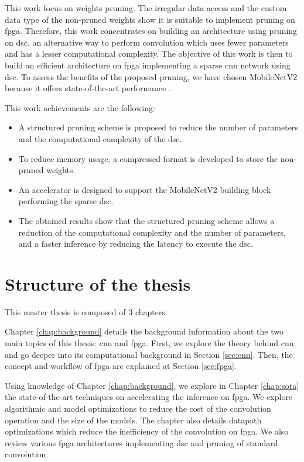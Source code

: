 This work focus on weights pruning. The irregular data access and the custom data type of the non-pruned weights show it is suitable to implement pruning on \acrshort{fpga}. Therefore, this work concentrates on building an architecture using pruning on \acrfull{dsc}, an alternative way to perform convolution which uses fewer parameters and has a lesser computational complexity. The objective of this work is then to build an efficient architecture on \acrshort{fpga} implementing a sparse \acrshort{cnn} network using \acrshort{dsc}. To assess the benefits of the proposed pruning, we have chosen MobileNetV2 because it offers state-of-the-art performance \cite{sandler_mobilenetv2_2019}.

This work achievements are the following:
%
\begin{itemize}
    \item A structured pruning scheme is proposed to reduce the number of parameters and the computational complexity of the \acrshort{dsc}.
    \item To reduce memory usage, a compressed format is developed to store the non-pruned weights.
    \item An accelerator is designed to support the MobileNetV2 building block performing the sparse \acrshort{dsc}.
    \item The obtained results show that the structured pruning scheme allows a reduction of the computational complexity and the number of parameters, and a faster inference by reducing the latency to execute the \acrshort{dsc}.
\end{itemize}
%
%
\section*{Structure of the thesis}
%
%
This master thesis is composed of 3 chapters.

Chapter \ref{chap:background} details the background information about the two main topics of this thesis: \acrshort{cnn} and \acrshort{fpga}. First, we explore the theory behind \acrshort{cnn} and go deeper into its computational background in Section \ref{sec:cnn}. Then, the concept and workflow of \acrshort{fpga} are explained at Section \ref{sec:fpga}.

Using knowledge of Chapter \ref{chap:background}, we explore in Chapter \ref{chap:sota} the state-of-the-art techniques on accelerating the inference on \acrshort{fpga}. We explore algorithmic and model optimizations to reduce the cost of the convolution operation and the size of the models. The chapter also details datapath optimizations which reduce the inefficiency of the convolution on \acrshort{fpga}. We also review various \acrshort{fpga} architectures implementing \acrshort{dsc} and pruning of standard convolution.


